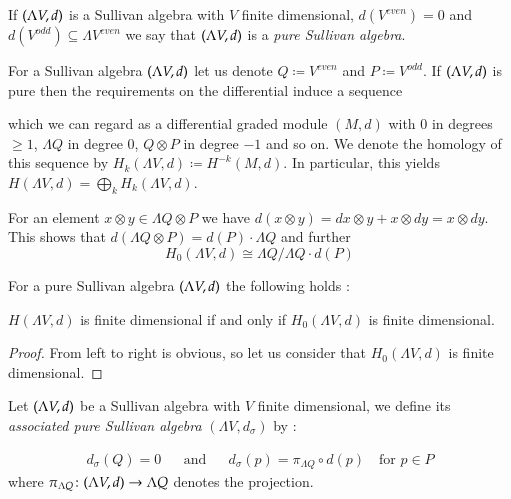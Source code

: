 \begin{Definition}
 If $(\Lambda V,d)$ is a Sullivan algebra with $V$ finite dimensional, $d(V^{even}) = 0$
 and $d(V^{odd}) \subseteq \Lambda V^{even}$ we say that $(\Lambda V,d)$ is a \emph{pure Sullivan algebra}.
\end{Definition}

For a Sullivan algebra $(\Lambda V,d)$ let us denote $ Q \coloneqq V^{even}$ and $P \coloneqq V^{odd}$.
If $(\Lambda V,d)$ is pure then the requirements on the differential induce a sequence

\centerline{
}

which we can regard as a differential graded module $(M,d)$ with $0$ in degrees $\geq 1$, $\Lambda Q$ in degree $0$,
$Q \otimes P$ in degree $-1$ and so on.
We denote the homology of this sequence by $H_k(\Lambda V,d) \coloneqq H^{-k}(M,d)$. In particular, this yields
$ H(\Lambda V,d) = \bigoplus_k H_k(\Lambda V,d)$. \par
For an element $x \otimes y \in \Lambda Q \otimes P$ we have 
$ d( x \otimes y) = dx \otimes y + x \otimes dy = x \otimes dy$. This shows that
$d( \Lambda Q \otimes P) = d(P) \cdot \Lambda Q$ and further
$$H_0(\Lambda V, d) \cong \Lambda Q / \Lambda Q \cdot d(P)$$

\begin{Proposition}
\label{prop:FiniteDimensionDependentOnDegreeOne}
 For a pure Sullivan algebra $(\Lambda V,d)$ the following holds :
 
  $H(\Lambda V,d)$ is finite dimensional if and only if $H_0(\Lambda V,d)$ is finite dimensional.
 
\end{Proposition}

\begin{proof}
 From left to right is obvious, so let us consider that $H_0(\Lambda V,d)$ is finite dimensional.
\end{proof}

\begin{Definition}
 Let $(\Lambda V,d)$ be a Sullivan algebra with $V$ finite dimensional, we define its 
 \emph{associated pure Sullivan algebra} $(\Lambda V, d_{\sigma})$ by :
 
 \begin{align*}
  d_{\sigma} (Q) = 0 & & \text{and} & & d_{\sigma}(p) = \pi_{\Lambda Q} \circ d(p) \quad \text{for $p \in P$}
 \end{align*}
 where $\pi_{\Lambda Q} \colon (\Lambda V,d) \to \Lambda Q$ denotes the projection.
 \end{Definition}


